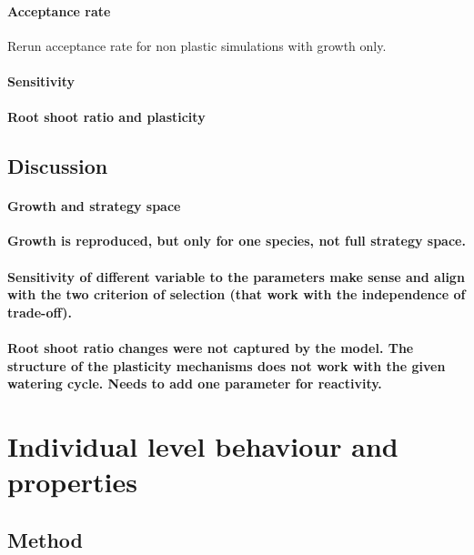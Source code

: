 \paragraph{Acceptance rate}
Rerun acceptance rate for non plastic simulations with growth only.

\paragraph{Sensitivity}

\paragraph{Root shoot ratio and plasticity}

\subsection{Discussion}

\paragraph{Growth and strategy space}

\textbf{Growth is reproduced, but only for one species, not full strategy space.}

\paragraph{}

\textbf{Sensitivity of different variable to the parameters make sense and align with the two criterion of selection (that work with the independence of trade-off).}

\paragraph{}

\textbf{Root shoot ratio changes were not captured by the model. The structure of the plasticity mechanisms does not work with the given watering cycle. Needs to add one parameter for reactivity.}


\section{Individual level behaviour and properties}
\subsection{Method}


